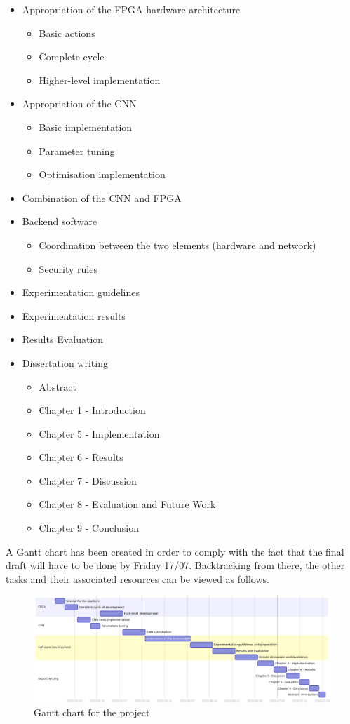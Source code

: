 \begin{itemize}
  \item Appropriation of the FPGA hardware architecture
  \begin{itemize}
    \item Basic actions
    \item Complete cycle
    \item Higher-level implementation
  \end{itemize}
  \item Appropriation of the CNN
  \begin{itemize}
    \item Basic implementation
    \item Parameter tuning
    \item Optimisation implementation
  \end{itemize}
  \item Combination of the CNN and FPGA
  \item Backend software
  \begin{itemize}
    \item Coordination between the two elements (hardware and network)
    \item Security rules
  \end{itemize}
  \item Experimentation guidelines
  \item Experimentation results
  \item Results Evaluation
  \item Dissertation writing
  \begin{itemize}
    \item Abstract
    \item Chapter 1 - Introduction
    \item Chapter 5 - Implementation
    \item Chapter 6 - Results
    \item Chapter 7 - Discussion
    \item Chapter 8 - Evaluation and Future Work
    \item Chapter 9 - Conclusion
  \end{itemize}
\end{itemize}

A Gantt chart has been created in order to comply with the fact that the final draft will have to be done by Friday 17/07. Backtracking from there, the other tasks and their associated resources can be viewed as follows.

\begin{figure}[htbp]
	\centering
		\includegraphics[width=\textwidth]{Figures/gantt.png}
	\caption[Gantt Chart]{Gantt chart for the project}
	\label{fig:gantt}
\end{figure}

